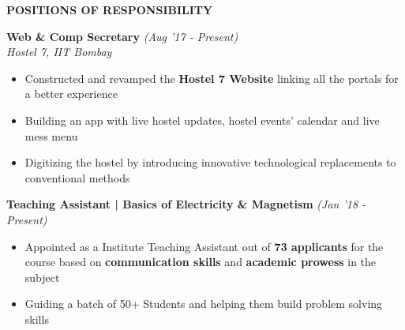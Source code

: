 \documentclass[11pt]{article}%
\begin{document}
\pagebreak






























\begin{flushleft}
\bf{\LARGE{P}\Large{OSITIONS} \LARGE{O}\Large{F} \LARGE{R}\Large{ESPONSIBILITY}}
\vspace{-2mm}
\end{flushleft}
\hline








\vspace{-0.2cm}
{\flushleft \bf \large{Web \& Comp Secretary}} \hfill {{{\em {(Aug '17 - Present)}}}}\\{\em{Hostel 7, IIT Bombay}}
\begin{itemize}
\setlength\itemsep{0.01em}
\vspace{-0.2cm}
\item Constructed and revamped the \textbf{Hostel 7 Website} linking all the portals for a better experience
\item Building an app with live hostel updates, hostel events’ calendar and live mess menu
\item \nohyphens{Digitizing the hostel by introducing innovative technological replacements to conventional methods}
\end{itemize}
\vspace{-1mm}







\vspace{-0.4cm}
{\flushleft \bf \large{Teaching Assistant | Basics of Electricity \& Magnetism}} \hfill {{{\em {(Jan '18 - Present)}}}}
\begin{itemize}
\setlength\itemsep{0.015em}
\vspace{-0.2cm}
\item Appointed as a Institute Teaching Assistant out of \textbf{73 applicants} for the course based on \textbf{communication skills} and \textbf{academic prowess} in the subject
\vspace{-1mm}
\item Guiding a batch of 50+ Students and helping them build problem solving skills
\end{itemize}
\vspace{-1mm}
\end{document}
